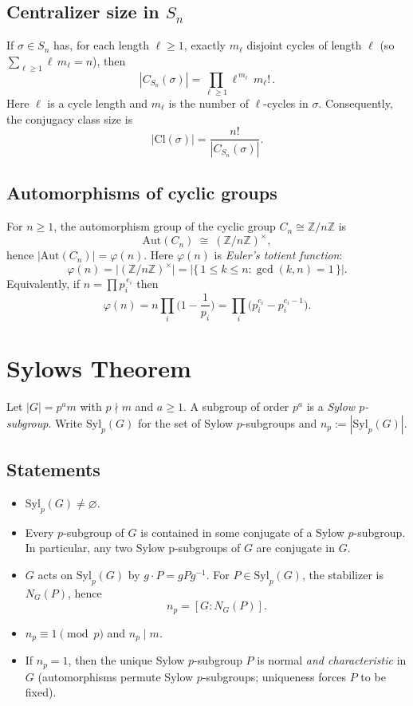 \documentclass[12pt]{article}
\begin{document}
\subsection{Centralizer size in $S_n$}
If $\sigma\in S_n$ has, for each length $\ell\ge1$, exactly $m_\ell$ disjoint cycles of length $\ell$
(so $\sum_{\ell\ge1}\ell\,m_\ell=n$), then
\[
|C_{S_n}(\sigma)|=\prod_{\ell\ge1}\ell^{\,m_\ell}\,m_\ell!\,.
\]
Here $\ell$ is a cycle length and $m_\ell$ is the number of $\ell$-cycles in $\sigma$.
Consequently, the conjugacy class size is
\[
|\mathrm{Cl}(\sigma)|=\frac{n!}{|C_{S_n}(\sigma)|}.
\]

\subsection{Automorphisms of cyclic groups}
For $n\ge1$, the automorphism group of the cyclic group $C_n\cong \mathbb Z/n\mathbb Z$ is
\[
\mathrm{Aut}(C_n)\ \cong\ (\mathbb Z/n\mathbb Z)^\times,
\]
hence $|\mathrm{Aut}(C_n)|=\varphi(n)$. Here $\varphi(n)$ is \emph{Euler's totient function}:
\[
\varphi(n)=\big|(\mathbb Z/n\mathbb Z)^\times\big|
= |\{\,1\le k\le n:\gcd(k,n)=1\,\}|.
\]
Equivalently, if $n=\prod p_i^{\,e_i}$ then
\[
\varphi(n)=n\!\prod_{i}\!\Big(1-\frac1{p_i}\Big)
=\prod_{i}\!\big(p_i^{e_i}-p_i^{e_i-1}\big).
\]


\section{Sylows Theorem}
Let $|G|=p^{a}m$ with $p\nmid m$ and $a\ge1$. A subgroup of order $p^{a}$ is a \emph{Sylow $p$-subgroup}.  
Write $\mathrm{Syl}_p(G)$ for the set of Sylow $p$-subgroups and $n_p:=|\mathrm{Syl}_p(G)|$.

\subsection{Statements}
\begin{itemize}[leftmargin=1.2em]
  \item $\mathrm{Syl}_p(G) \neq \varnothing $.
  \item Every $p$-subgroup of $G$ is contained in some conjugate of a Sylow $p$-subgroup. In particular, any two Sylow p-subgroups of $G$ are conjugate in $G$.
  \item $G$ acts on $\mathrm{Syl}_p(G)$ by $g\cdot P = gPg^{-1}$.  
  For $P\in\mathrm{Syl}_p(G)$, the stabilizer is $N_G(P)$, hence
  \[
    n_p = [G : N_G(P)].
    \]
  \item $n_p \equiv 1 \pmod p$ and $n_p \mid m$.
  \item If $n_p=1$, then the unique Sylow $p$-subgroup $P$ is normal \emph{and characteristic} in $G$
        (automorphisms permute Sylow $p$-subgroups; uniqueness forces $P$ to be fixed).
\end{itemize}
\end{document}
